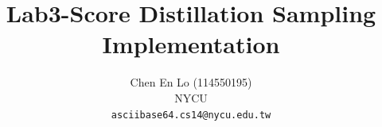 \documentclass[10pt,twocolumn,letterpaper]{article}
\title{Lab3-Score Distillation Sampling Implementation}
\author{Chen En Lo (114550195)\\
NYCU\\
{\tt\small asciibase64.cs14@nycu.edu.tw}
}
\begin{document}





{
    \small
    
    
}
\end{document}
